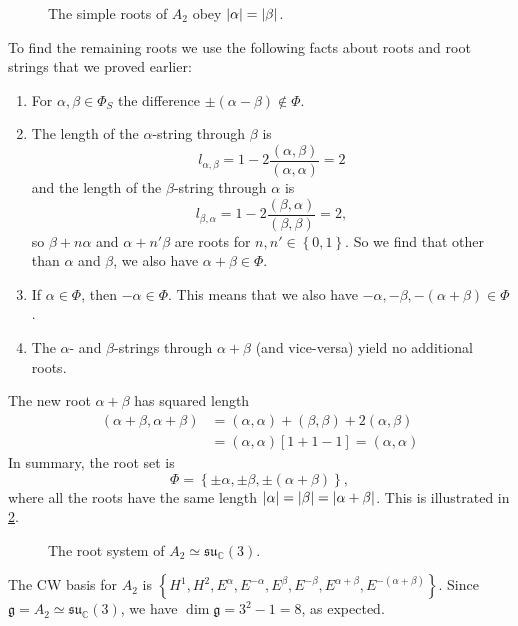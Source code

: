 \begin{figure}[tb]
  \centering
  \def\svgwidth{0.3\columnwidth}
  
  \caption{The simple roots of $A_2$ obey $\abs{\alpha} = \abs{\beta}$.}
  \label{fig:l21f1}
\end{figure}

To find the remaining roots we use the following facts about roots and root strings that we proved earlier:
\begin{enumerate}
  \item For $\alpha, \beta \in \Phi_S$ the difference $\pm (\alpha - \beta) \not \in \Phi$.
  \item The length of the $\alpha$-string through $\beta$  is \begin{equation}
      l_{\alpha, \beta} = 1 - 2 \frac{(\alpha, \beta)}{(\alpha, \alpha)} = 2
  \end{equation}  
  and the length of the $\beta$-string through $\alpha$ is 
    \begin{equation}
      l_{\beta, \alpha} = 1 - 2 \frac{(\beta, \alpha)}{(\beta, \beta)} = 2,
  \end{equation}  
  so $\beta + n \alpha$ and $\alpha + n' \beta$ are roots for $n, n' \in \left\{ 0, 1 \right\}$. So we find that other than $\alpha$ and $\beta$, we also have $\alpha + \beta \in \Phi$.
  \item If $\alpha \in \Phi$, then $-\alpha \in \Phi$.  This means that we also have $-\alpha, -\beta, -(\alpha + \beta) \in \Phi$.
  \item The $\alpha$- and $\beta$-strings through $\alpha + \beta$ (and vice-versa) yield no additional roots.
\end{enumerate}
The new root $\alpha + \beta$ has squared length
\begin{align}
  (\alpha + \beta, \alpha + \beta) &= (\alpha, \alpha) + (\beta, \beta) + 2 (\alpha, \beta) \\
				   &= (\alpha, \alpha) [1 + 1 - 1] = (\alpha, \alpha)
\end{align}
In summary, the root set is
\begin{equation}
  \Phi = \left\{ \pm \alpha, \pm \beta, \pm (\alpha + \beta) \right\},
\end{equation}
where all the roots have the same length $\abs{\alpha} = \abs{\beta} = \abs{\alpha + \beta}$.
This is illustrated in \ref{fig:l21f2}.
\begin{figure}[tbhp]
  \centering
  \def\svgwidth{0.4\columnwidth}
  
  \caption{The root system of $A_2 \simeq \mathfrak{su}_{\mathbb{C}}(3)$.}
  \label{fig:l21f2}
\end{figure}
The CW basis for $A_2$ is $\left\{ H^1, H^2, E^{\alpha}, E^{-\alpha}, E^{\beta}, E^{-\beta}, E^{\alpha + \beta}, E^{-(\alpha + \beta)} \right\}$.
Since $\mathfrak{g} = A_2 \simeq \mathfrak{su}_{\mathbb{C}}(3)$, we have $\dim \mathfrak{g} = 3^2 - 1 = 8$, as expected.

